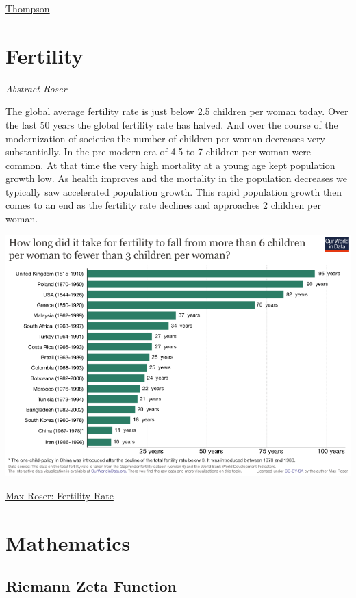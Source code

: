 \documentclass[
]{book}
\begin{document}
\href{https://engelsbergideas.com/essays/the-geopolitical-fight-to-come-over-green-energy/}{Thompson}

\hypertarget{fertility}{%
\chapter{Fertility}\label{fertility}}

\emph{Abstract Roser}

The global average fertility rate is just below 2.5 children per woman today. Over the last 50 years the global fertility rate has halved. And over the course of the modernization of societies the number of children per woman decreases very substantially. In the pre-modern era of 4.5 to 7 children per woman were common. At that time the very high mortality at a young age kept population growth low. As health improves and the mortality in the population decreases we typically saw accelerated population growth. This rapid population growth then comes to an end as the fertility rate declines and approaches 2 children per woman.

\includegraphics{fig/fertility_fall_countries.png}

\href{https://ourworldindata.org/fertility-rate}{Max Roser: Fertility Rate}

\hypertarget{mathematics}{%
\chapter{Mathematics}\label{mathematics}}

\hypertarget{riemann-zeta-function}{%
\section{Riemann Zeta Function}\label{riemann-zeta-function}}
\end{document}
